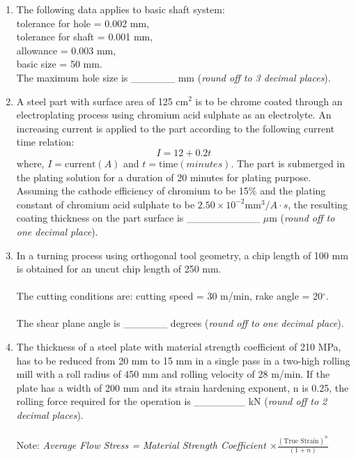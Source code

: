 \documentclass[12pt,onecolumn]{article}
\begin{document}
\begin{enumerate}
    \item The following data applies to basic shaft system:\\
          tolerance for hole = 0.002 mm,\\
          tolerance for shaft = 0.001 mm,\\
          allowance = 0.003 mm,\\
          basic size = 50 mm.\\
          The maximum hole size is \_\_\_\_\_\_ mm (\textit{round off to 3 decimal places}).

    \item A steel part with surface area of 125 cm$^2$ is to be chrome coated through an electroplating process using chromium acid sulphate as an electrolyte. An increasing current is applied to the part according to the following current time relation:
          \[ I = 12 + 0.2t \] where, $I = \text{current}(A)$ and $t = \text{time}(minutes)$. The part is submerged in the plating solution for a duration of 20 minutes for plating purpose. Assuming the cathode efficiency of chromium to be 15\% and the plating constant of chromium acid sulphate to be $2.50\times10^{-2} \text{mm}^3/A\cdot s$, the resulting coating thickness on the part surface is \_\_\_\_\_\_\_\_\_\_ $\mu$m (\textit{round off to one decimal place}).

    \item In a turning process using orthogonal tool geometry, a chip length of 100 mm is obtained for an uncut chip length of 250 mm.\\\\
          The cutting conditions are: cutting speed = 30 m/min, rake angle = 20$^\circ$.\\\\
          The shear plane angle is \_\_\_\_\_\_ degrees (\textit{round off to one decimal place}).

    \item The thickness of a steel plate with material strength coefficient of 210 MPa, has to be reduced from 20 mm to 15 mm in a single pass in a two-high rolling mill with a roll radius of 450 mm and rolling velocity of 28 m/min. If the plate has a width of 200 mm and its strain hardening exponent, n is 0.25, the rolling force required for the operation is \_\_\_\_\_\_\_ kN (\textit{round off to 2 decimal places}).\\\\
          Note: \textit{Average Flow Stress = Material Strength Coefficient $\times\frac{(\text{True Strain})^n}{(1+n)}$}


\end{enumerate}
\end{document}

